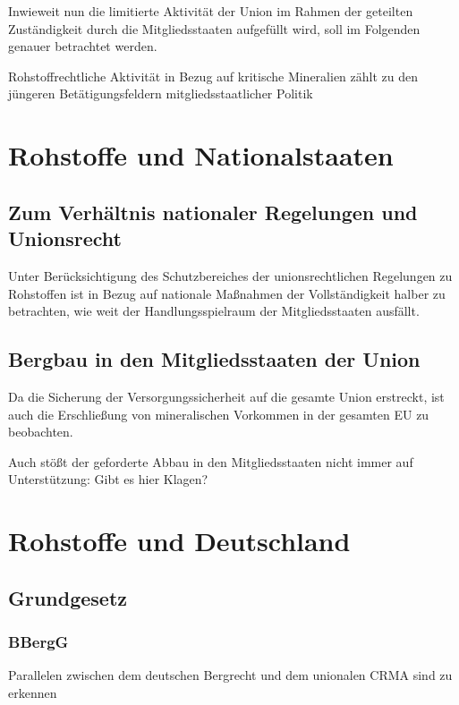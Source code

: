 \documentclass[12pt,a4paper,oneside]{book} %
\begin{document}
	Inwieweit nun die limitierte Aktivität der Union im Rahmen der geteilten Zuständigkeit durch die Mitgliedsstaaten aufgefüllt wird, soll im Folgenden genauer betrachtet
	 werden.
	 
	 Rohstoffrechtliche Aktivität in Bezug auf kritische Mineralien zählt zu den jüngeren Betätigungsfeldern mitgliedsstaatlicher Politik
	
	
	 
	
	\section{Rohstoffe und Nationalstaaten}
	
	\subsection{Zum Verhältnis nationaler Regelungen und Unionsrecht}
	Unter Berücksichtigung des Schutzbereiches der unionsrechtlichen Regelungen zu Rohstoffen ist in Bezug auf nationale Maßnahmen der Vollständigkeit halber zu betrachten, wie weit der Handlungsspielraum der Mitgliedsstaaten ausfällt.
	
	\subsection{Bergbau in den Mitgliedsstaaten der Union}
	
Da die Sicherung der Versorgungssicherheit auf die gesamte Union erstreckt, ist auch die Erschließung von mineralischen Vorkommen in der gesamten EU zu beobachten.	


Auch stößt der geforderte Abbau in den Mitgliedsstaaten nicht immer auf Unterstützung: Gibt es hier Klagen?
	
	\section{Rohstoffe und Deutschland}
	
	\subsection{Grundgesetz}
	
	\subsubsection{BBergG}
	Parallelen zwischen dem deutschen Bergrecht und dem unionalen CRMA sind zu erkennen
	
\end{document}
